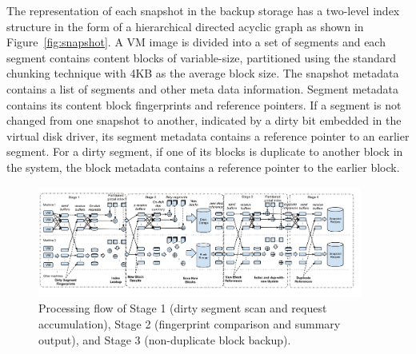 The representation of each snapshot in the backup storage
has a two-level index structure in the form of a hierarchical
directed acyclic graph as shown in Figure~\ref{fig:snapshot}.
A VM image is divided into a set of segments and each  segment contains 
content blocks of variable-size, partitioned using
the standard chunking technique with 4KB as the average block size. 
The snapshot metadata  contains a list of segments and other meta data information.
Segment metadata  contains its  content block fingerprints and reference pointers. 
If a segment is not changed from one snapshot to another, indicated by a dirty bit embedded in the virtual disk driver, 
its segment metadata contains a reference pointer to an earlier segment.
For a dirty segment, if one of its blocks is duplicate to another block in the system,  
the block metadata contains a reference pointer to the earlier block.





\begin{figure}[tbhp]
\centering

\includegraphics[width=0.95\textwidth]{images/DataFlow.pdf}
\caption{Processing flow of Stage  1 (dirty segment scan and request accumulation), Stage 2 
(fingerprint comparison and summary output),  and Stage 3 (non-duplicate block backup).}
\label{fig:flow}
\end{figure}


